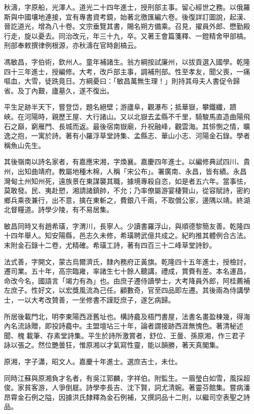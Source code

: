 \begin{pinyinscope}
秋濤，字原船，光澤人。道光二十四年進士，授刑部主事。留心經世之務。以俄羅斯與中國壤地連接，宜有專書資考鏡，始著北徼匯編六卷。後復詳訂圖說，起漢、晉訖道光，增為八十卷。文宗垂覽其書，賜名朔方備乘。召見，擢員外郎、懋勤殿行走，旋以憂去。同治改元，年三十九，卒。又著王會篇箋釋、一鐙精舍甲部槁。刑部奉敕撰律例根源，亦秋濤在官時創槁云。

馮敏昌，字伯術，欽州人。童年補諸生。翁方綱按試廉州，以拔貢選入國學。乾隆四十三年進士，授編修。大考，改戶部主事，調補刑部。性至孝友，聞父喪，一痛嘔血，大雪，徒跣竟日。方綱憂曰：「敏昌萬無生理！」則持其母夫人書促令歸省。及丁內艱，廬墓久，遂不復出。

平生足跡半天下，嘗登岱，題名絕壁；游廬阜，觀瀑布；抵華嶽，攀鐵纖，躋峽。在河陽時，親歷王屋、大行諸山。又以北嶽去孟縣不千里，騎駿馬直造曲陽飛石之巔，窮雁門、長城而返。最後宿南嶽廟，升祝融峰，觀雲海。其悱惻之情，曠逸之抱，一寓於詩。著有小羅浮草堂詩集、孟縣志、華山小志、河陽金石錄。學者稱魚山先生。

其後嶺南以詩名家者，有嘉應宋湘，字煥襄。嘉慶四年進士。以編修典試四川、貴州，出知曲靖府。教屬地種木棉，人稱「宋公布」。署廣南、永昌，皆有績。永昌灣甸土州知州死，遠族景在東謀襲其職，據境專殺自恣，如是者五六年。當事怯，莫敢發。民、夷赴愬，湘請諸鎮帥，不允；乃率僚屬游宴棲賢山，從容賦詩，密約鄉兵乘夜兼行，出不意，擒在東斬之，費銀八千兩，不取償公家，邊隅以靖。終湖北督糧道。詩學少陵，有不易居集。

敏昌同時又有趙希璜，字渭川，長寧人。少讀書羅浮山，與順德黎簡友善。乾隆四十四年舉人。知安陽縣，邑志久未修，希璜聘武億共成之。紀昀推其體例合古法。末附金石錄十二卷，尤精確。希璜工詩，著有四百三十二峰草堂詩鈔。

法式善，字開文，蒙古烏爾濟氏，隸內務府正黃旗。乾隆四十五年進士，授檢討，遷司業。五十年，高宗臨雍，率諸生七十餘人聽講，禮成，賞賚有差。本名運昌，命改今名，國語言「竭力有為」也。由庶子遷侍讀學士，大考降員外郎，阿桂薦補左庶子。性好文，以宏獎風流為己任。顧數奇，官至四品即左遷。其後兩為侍講學士，一以大考改贊善，一坐修書不謹貶庶子，遂乞病歸。

所居後載門北，明李東陽西涯舊址也。構詩龕及梧門書屋，法書名畫盈棟幾，得海內名流詠贈，即投詩龕中。主盟壇坫三十年，論者謂接跡西涯無愧色。著清秘述聞、槐載筆、存素堂詩集。平生於詩所激賞者，舒位、王曇、孫原湘，作三君子詠以張之。然位艷曇狂，惟原湘以才氣寫性靈，能以韻勝，著天真閣集。

原湘，字子瀟，昭文人。嘉慶十年進士。選庶吉士，未仕。

同時江蘇與原湘負才名者，有吳江郭麟，字祥伯。附監生。一眉瑩白如雪，風採超俊。家貧客游，人爭倒屣。詩學李長吉、沈下賢，詞尤清婉。著靈芬館集。嘗病潘昂霄金石例之隘，因據洪氏隸釋為金石例補，又撰詞品十二則，以繼司空表聖之詩品。


\end{pinyinscope}
